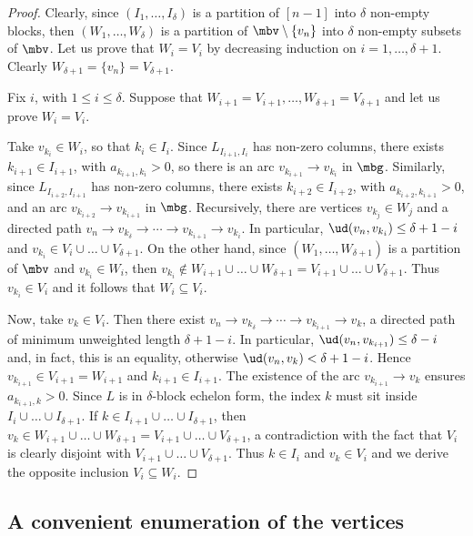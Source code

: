 \begin{proof}
Clearly, since $(I_1,\ldots, I_\delta)$ is a partition of $[n-1]$ into
$\delta$ non-empty blocks, then $(W_1,\ldots ,W_{\delta})$ is a
partition of $\mbv\setminus\{v_n\}$ into $\delta$ non-empty subsets of
$\mbv$. Let us prove that $W_i=V_i$ by decreasing induction on
$i=1,\ldots ,\delta+1$. Clearly $W_{\delta+1}=\{v_n\}=V_{\delta+1}$.

Fix $i$, with $1\leq i\leq\delta$. Suppose that
$W_{i+1}=V_{i+1},\ldots ,W_{\delta+1}=V_{\delta+1}$ and let us prove
$W_i=V_i$.

Take $v_{k_i}\in W_i$, so that $k_i\in I_i$.  Since
$L_{I_{i+1},I_{i}}$ has non-zero columns, there exists $k_{i+1}\in
I_{i+1}$, with $a_{k_{i+1},k_i}>0$, so there is an arc $v_{k_{i+1}}\to
v_{k_i}$ in $\mbg$. Similarly, since $L_{I_{i+2},I_{i+1}}$ has
non-zero columns, there exists $k_{i+2}\in I_{i+2}$, with
$a_{k_{i+2},k_{i+1}}>0$, and an arc $v_{k_{i+2}}\to v_{k_{i+1}}$ in
$\mbg$. Recursively, there are vertices $v_{k_j}\in W_{j}$ and a
directed path $v_n\to v_{k_{\delta}}\to\cdots \to v_{k_{i+1}}\to
v_{k_i}$. In particular, $\ud(v_n,v_{k_i})\leq \delta+1-i$ and
$v_{k_i}\in V_{i}\cup\ldots \cup V_{\delta+1}$. On the other hand, since
$(W_1,\ldots ,W_{\delta+1})$ is a partition of $\mbv$ and $v_{k_i}\in
W_i$, then $v_{k_i}\not\in W_{i+1}\cup\ldots \cup
W_{\delta+1}=V_{i+1}\cup\ldots\cup V_{\delta+1}$. Thus $v_{k_i}\in
V_i$ and it follows that $W_i\subseteq V_i$.

Now, take $v_{k}\in V_i$. Then there exist $v_n\to
v_{k_\delta}\to\cdots \to v_{k_{i+1}}\to v_k$, a directed path of
minimum unweighted length $\delta+1-i$. In particular,
$\ud(v_n,v_{k_{i+1}})\leq \delta-i$ and, in fact, this is an equality,
otherwise $\ud(v_n,v_k)<\delta+1-i$. Hence $v_{k_{i+1}}\in
V_{i+1}=W_{i+1}$ and $k_{i+1}\in I_{i+1}$. The existence of the arc
$v_{k_{i+1}}\to v_k$ ensures $a_{k_{i+1},k}>0$. Since $L$ is in
$\delta$-block echelon form, the index $k$ must sit inside
$I_i\cup\ldots \cup I_{\delta +1}$. If $k\in I_{i+1}\cup\ldots \cup
I_{\delta+1}$, then $v_k\in W_{i+1}\cup\ldots \cup
W_{\delta+1}=V_{i+1}\cup\ldots\cup V_{\delta+1}$, a contradiction with
the fact that $V_i$ is clearly disjoint with $V_{i+1}\cup\ldots\cup
V_{\delta+1}$.  Thus $k\in I_{i}$ and $v_k\in V_i$ and we derive the
opposite inclusion $V_i\subseteq W_i$.
\end{proof}

\subsection{A convenient enumeration of the vertices} 

